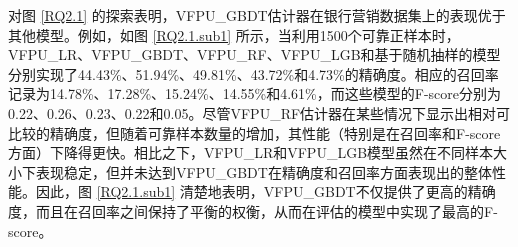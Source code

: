 对图 \ref{RQ2.1} 的探索表明，VFPU\_GBDT估计器在银行营销数据集上的表现优于其他模型。例如，如图 \ref{RQ2.1.sub1} 所示，当利用1500个可靠正样本时，VFPU\_LR、VFPU\_GBDT、VFPU\_RF、VFPU\_LGB和基于随机抽样的模型分别实现了44.43\%、51.94\%、49.81\%、43.72\%和4.73\%的精确度。相应的召回率记录为14.78\%、17.28\%、15.24\%、14.55\%和4.61\%，而这些模型的F-score分别为0.22、0.26、0.23、0.22和0.05。尽管VFPU\_RF估计器在某些情况下显示出相对可比较的精确度，但随着可靠样本数量的增加，其性能（特别是在召回率和F-score方面）下降得更快。相比之下，VFPU\_LR和VFPU\_LGB模型虽然在不同样本大小下表现稳定，但并未达到VFPU\_GBDT在精确度和召回率方面表现出的整体性能。因此，图 \ref{RQ2.1.sub1} 清楚地表明，VFPU\_GBDT不仅提供了更高的精确度，而且在召回率之间保持了平衡的权衡，从而在评估的模型中实现了最高的F-score。
\vspace{-0.1cm}
\begin{figure}[H]
	\centering

\end{figure}
